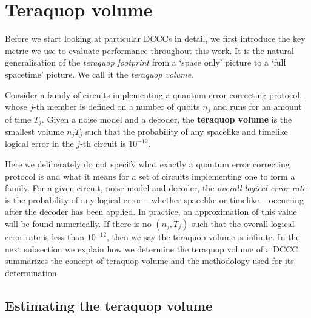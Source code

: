 \section{Teraquop volume}\label{sec:teraquop_volume}

Before we start looking at particular DCCCs in detail, we first introduce the key
metric we use to evaluate performance throughout this work.
It is the natural generalisation of the \emph{teraquop footprint} \cite{gidney2021fault} from a `space only' picture to a `full spacetime' picture.
We call it the \emph{teraquop volume}.

\begin{definition}
    Consider a family of circuits implementing a quantum error correcting protocol, whose $j$-th member is defined on a number of qubits $n_j$ and runs for an amount of time $T_j$.
    Given a noise model and a decoder,
    the \textbf{teraquop volume} is the smallest volume $n_j T_j$ such that the probability of any spacelike and timelike logical error in the $j$-th circuit is $10^{-12}$.
\end{definition}

Here we deliberately do not specify what exactly a quantum error correcting protocol is and what it means for a set of circuits implementing one to form a family.
For a given circuit, noise model and decoder, the \emph{overall logical error rate} is the probability of any logical error -- whether spacelike or timelike -- occurring after the decoder has been applied.
In practice, an approximation of this value will be found numerically.
If there is no $(n_j, T_j)$ such that the overall logical error rate is less than $10^{-12}$,
then we say the teraquop volume is infinite.
In the next subsection we explain how we determine the teraquop volume of a DCCC.
 summarizes the concept of teraquop volume and the methodology used for its determination.

\subsection{Estimating the teraquop volume}\label{subsec:estimating-teraquop-volume}

